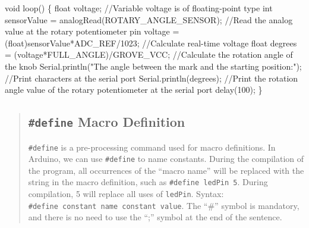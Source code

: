 \documentclass[
  letterpaper,
  DIV=11,
  numbers=noendperiod]{scrreprt}
\newenvironment{Shaded}{\begin{snugshade}}{\end{snugshade}}
\newcommand{\CommentTok}[1]{\textcolor[rgb]{0.37,0.37,0.37}{#1}}
\newcommand{\DataTypeTok}[1]{\textcolor[rgb]{0.68,0.00,0.00}{#1}}
\newcommand{\DecValTok}[1]{\textcolor[rgb]{0.68,0.00,0.00}{#1}}
\newcommand{\NormalTok}[1]{\textcolor[rgb]{0.00,0.23,0.31}{#1}}
\newcommand{\OperatorTok}[1]{\textcolor[rgb]{0.37,0.37,0.37}{#1}}
\newcommand{\StringTok}[1]{\textcolor[rgb]{0.13,0.47,0.30}{#1}}
\begin{document}
\begin{Shaded}
\begin{Highlighting}[]
\DataTypeTok{void}\NormalTok{ loop}\OperatorTok{()}
\OperatorTok{\{}   
    \DataTypeTok{float}\NormalTok{ voltage}\OperatorTok{;}    \CommentTok{//Variable voltage is of floating{-}point type}
    \DataTypeTok{int}\NormalTok{ sensorValue }\OperatorTok{=}\NormalTok{ analogRead}\OperatorTok{(}\NormalTok{ROTARY\_ANGLE\_SENSOR}\OperatorTok{);}    \CommentTok{//Read the analog value at the rotary potentiometer pin}
\NormalTok{    voltage }\OperatorTok{=} \OperatorTok{(}\DataTypeTok{float}\OperatorTok{)}\NormalTok{sensorValue}\OperatorTok{*}\NormalTok{ADC\_REF}\OperatorTok{/}\DecValTok{1023}\OperatorTok{;}    \CommentTok{//Calculate real{-}time voltage}
    \DataTypeTok{float}\NormalTok{ degrees }\OperatorTok{=} \OperatorTok{(}\NormalTok{voltage}\OperatorTok{*}\NormalTok{FULL\_ANGLE}\OperatorTok{)/}\NormalTok{GROVE\_VCC}\OperatorTok{;}    \CommentTok{//Calculate the rotation angle of the knob}
\NormalTok{    Serial}\OperatorTok{.}\NormalTok{println}\OperatorTok{(}\StringTok{"The angle between the mark and the starting position:"}\OperatorTok{);}    \CommentTok{//Print characters at the serial port}
\NormalTok{    Serial}\OperatorTok{.}\NormalTok{println}\OperatorTok{(}\NormalTok{degrees}\OperatorTok{);}    \CommentTok{//Print the rotation angle value of the rotary potentiometer at the serial port}
\NormalTok{    delay}\OperatorTok{(}\DecValTok{100}\OperatorTok{);}
\OperatorTok{\}}
\end{Highlighting}
\end{Shaded}

\begin{quote}
\hypertarget{define-macro-definition}{%
\subsection*{\texorpdfstring{\texttt{\#define} Macro
Definition}{\#define Macro Definition}}\label{define-macro-definition}}

\texttt{\#define} is a pre-processing command used for macro
definitions. In Arduino, we can use \texttt{\#define} to name constants.
During the compilation of the program, all occurrences of the ``macro
name'' will be replaced with the string in the macro definition, such as
\texttt{\#define\ ledPin\ 5}. During compilation, 5 will replace all
uses of \texttt{ledPin}. Syntax:
\texttt{\#define\ constant\ name\ constant\ value}. The ``\#'' symbol is
mandatory, and there is no need to use the ``;'' symbol at the end of
the sentence.
\end{quote}
\end{document}
